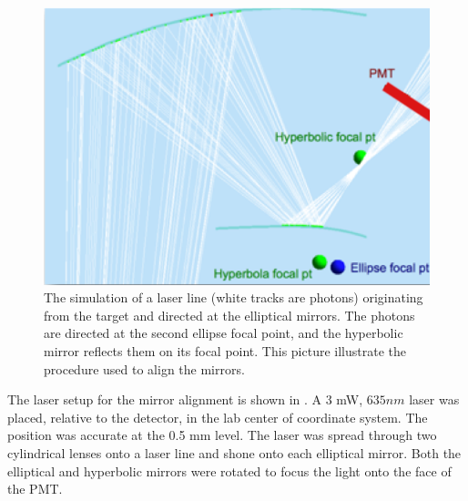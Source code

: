 \begin{figure}
\centering
	\includegraphics[width=1.0\columnwidth, keepaspectratio]{img/mirrorAlignmentSimulationZoomed.png}
	\caption{The simulation of a laser line (white tracks are photons) originating from the target and directed at the elliptical mirrors. The photons are directed
		      at the second ellipse focal point, and the hyperbolic mirror reflects them on its focal point. This picture illustrate the procedure used to align the mirrors.}
	\label{fig:alignmentSimulation}
\end{figure}

The laser setup for the mirror alignment is shown in . A 3 mW, $635 nm$ laser was placed, relative to the detector,
in the lab center of coordinate system. The position was accurate at the 0.5 mm level. The laser was spread through two cylindrical lenses onto a laser line and shone
onto each elliptical mirror. Both the elliptical and hyperbolic mirrors were rotated to focus the light onto the face of the PMT.

